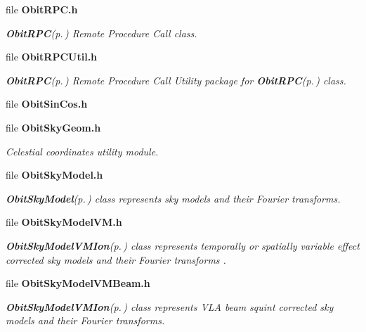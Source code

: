 \begin{CompactItemize}
\item 
file {\bf Obit\-RPC.h}
\begin{CompactList}\small\item\em {\bf Obit\-RPC}{\rm (p.\,\pageref{structObitRPC})} Remote Procedure Call class. \item\end{CompactList}

\item 
file {\bf Obit\-RPCUtil.h}
\begin{CompactList}\small\item\em {\bf Obit\-RPC}{\rm (p.\,\pageref{structObitRPC})} Remote Procedure Call Utility package for {\bf Obit\-RPC}{\rm (p.\,\pageref{structObitRPC})} class. \item\end{CompactList}

\item 
file {\bf Obit\-Sin\-Cos.h}
\item 
file {\bf Obit\-Sky\-Geom.h}
\begin{CompactList}\small\item\em Celestial coordinates utility module. \item\end{CompactList}

\item 
file {\bf Obit\-Sky\-Model.h}
\begin{CompactList}\small\item\em {\bf Obit\-Sky\-Model}{\rm (p.\,\pageref{structObitSkyModel})} class represents sky models and their Fourier transforms. \item\end{CompactList}

\item 
file {\bf Obit\-Sky\-Model\-VM.h}
\begin{CompactList}\small\item\em {\bf Obit\-Sky\-Model\-VMIon}{\rm (p.\,\pageref{structObitSkyModelVMIon})} class represents temporally or spatially variable effect corrected sky models and their Fourier transforms . \item\end{CompactList}

\item 
file {\bf Obit\-Sky\-Model\-VMBeam.h}
\begin{CompactList}\small\item\em {\bf Obit\-Sky\-Model\-VMIon}{\rm (p.\,\pageref{structObitSkyModelVMIon})} class represents VLA beam squint corrected sky models and their Fourier transforms. \item\end{CompactList}


\end{CompactItemize}
